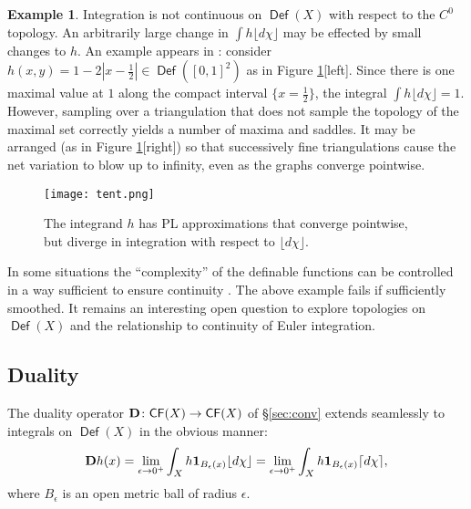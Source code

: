 \documentclass{psapm-l}
\theoremstyle{definition}
\newtheorem{example}[theorem]{Example}
\theoremstyle{remark}
\numberwithin{equation}{section}
\begin{document}
\begin{example}
Integration is not continuous on ${{{\operatorname{\mathsf{{Def}}}}}}(X)$ with respect to the $C^0$ topology. An arbitrarily large change in $\int h{{\lfloor d\chi\rfloor}}$ may be effected by small changes to $h$. An example appears in \cite{Wright}: consider $h(x,y)=1-2{\left\vert{{x-\frac{1}{2}}}\right\vert}\in{{{\operatorname{\mathsf{{Def}}}}}}([0,1]^2)$ as in Figure \ref{fig:tent}[left]. Since there is one maximal value at $1$ along the compact interval $\{x=\frac{1}{2}\}$, the integral $\int h{{\lfloor d\chi\rfloor}} = 1$.
However, sampling over a triangulation that does not sample the topology of the maximal set correctly yields a number of maxima and saddles. It may be arranged (as in Figure \ref{fig:tent}[right]) so that successively fine triangulations cause the net variation to blow up to infinity, even as the graphs converge pointwise.
\begin{figure}[hbt]
\begin{center}
\texttt{[image: tent.png]}
\caption{The integrand $h$ has PL approximations that converge pointwise, but diverge in integration with respect to ${{\lfloor d\chi\rfloor}}$.}
\label{fig:tent}
\end{center}
\end{figure}
In some situations the ``complexity'' of the definable functions can be controlled in a way sufficient to ensure continuity \cite{BG:PNAS}. The above example fails if sufficiently smoothed. It remains an interesting open question to explore topologies on ${{{\operatorname{\mathsf{{Def}}}}}}(X)$ and the relationship to continuity of Euler integration.
\end{example}

\subsection{Duality}
\label{sec:duality}
The duality operator ${{\bf D}}\colon{{{\operatorname{\mathsf{{CF}}}}}}(X)\to{{{\operatorname{\mathsf{{CF}}}}}}(X)$ of \S\ref{sec:conv} extends seamlessly to integrals on ${{{\operatorname{\mathsf{{Def}}}}}}(X)$ in the obvious manner:
\begin{equation}
\label{eq:defdual}
    {{\bf D}} h(x)
    =
    \lim_{\epsilon\to 0^+}\int_Xh{{\mathbf{1}}}_{B_\epsilon(x)}{{\lfloor d\chi\rfloor}}
    =
    \lim_{\epsilon\to 0^+}\int_Xh{{\mathbf{1}}}_{B_\epsilon(x)}{{\lceil d\chi\rceil}} ,
\end{equation}
where $B_\epsilon$ is an open metric ball of radius $\epsilon$.
\end{document}
